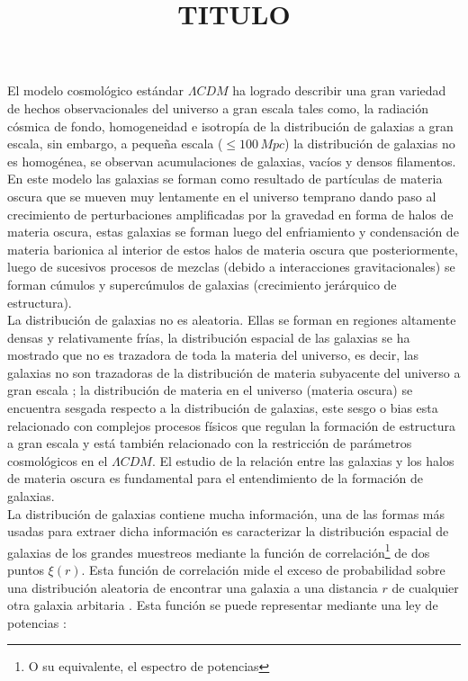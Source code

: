 \documentclass{bmcart}
\begin{document}
\begin{frontmatter}

\begin{fmbox}



\title{TITULO}


\end{fmbox}


\end{frontmatter}



El modelo cosmológico estándar $\Lambda CDM$ ha logrado describir una gran 
variedad de hechos observacionales del universo a gran escala tales como, la 
radiación cósmica de fondo, homogeneidad e isotropía de la distribución de 
galaxias a gran escala, sin embargo, a pequeña escala ($\leq 100\, Mpc$) la 
distribución de galaxias no es homogénea, se observan acumulaciones de 
galaxias, vacíos y densos filamentos. En este modelo las galaxias se forman 
como resultado de partículas de materia oscura que se mueven muy lentamente en 
el universo temprano dando paso al crecimiento de perturbaciones amplificadas 
por la gravedad en forma de halos de materia oscura, estas galaxias se forman 
luego del enfriamiento y condensación de materia barionica al interior de estos 
halos de materia oscura que posteriormente, luego de sucesivos procesos de 
mezclas (debido a interacciones gravitacionales) se forman cúmulos y 
supercúmulos de galaxias (crecimiento jerárquico de estructura). \\

La distribución de galaxias no es aleatoria. Ellas se forman en regiones 
altamente densas y relativamente frías, la distribución espacial de las 
galaxias se ha mostrado que no es trazadora de toda la materia del universo, es 
decir, las galaxias no son trazadoras de la distribución de materia subyacente 
del universo a gran escala \cite{1984ApJ...284L...9K}; la distribución de 
materia en el universo (materia oscura) se encuentra sesgada respecto a la 
distribución de galaxias, este sesgo o bias esta relacionado con complejos 
procesos físicos que regulan la formación de estructura a gran escala y está 
también relacionado con la restricción de parámetros cosmológicos en el 
$\Lambda CDM$. El estudio de la relación entre las galaxias y los halos de 
materia oscura es fundamental para el entendimiento de la formación de 
galaxias.\\

La distribución de galaxias contiene mucha información, una de las formas más 
usadas para extraer dicha información es caracterizar la distribución espacial 
de galaxias de los grandes muestreos mediante la función de 
correlación\footnote{O su equivalente, el espectro de potencias} de dos puntos 
$\xi(r)$. Esta función de correlación mide el exceso de probabilidad sobre una 
distribución aleatoria de encontrar una galaxia a una distancia $r$ de 
cualquier otra galaxia arbitaria 
\cite{1980lssu.book.....P}\cite{1993A&A...280....5M}. Esta función se puede 
representar mediante una ley de potencias 
\cite{1983ApJ...267..465D}\cite{1993A&A...280....5M}: 
\end{document}
